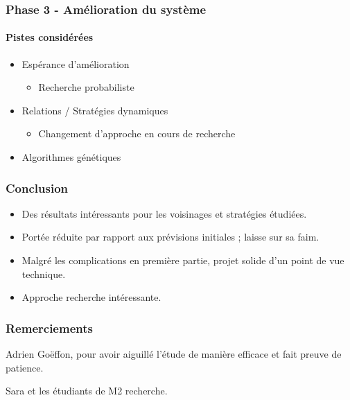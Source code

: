 \documentclass{beamer}
\begin{document}
\begin{frame}
  \frametitle{Phase 3 - Amélioration du système}
  \framesubtitle{Pistes considérées}
  
  \begin{itemize}
    \item Espérance d'amélioration
    \begin{itemize}
      \item Recherche probabiliste
    \end{itemize}
    \item Relations / Stratégies dynamiques
    \begin{itemize}
      \item Changement d'approche en cours de recherche
    \end{itemize}
    \item Algorithmes génétiques
  \end{itemize}

\end{frame}



\begin{frame}
  \frametitle{Conclusion}
  
  \begin{itemize}
    \item Des résultats intéressants pour les voisinages et stratégies étudiées.
    \item Portée réduite par rapport aux prévisions initiales ; laisse sur sa
faim.
    \item Malgré les complications en première partie, projet solide d'un
point de vue technique.
    \item Approche recherche intéressante.
  \end{itemize}

\end{frame}


\begin{frame}
  \frametitle{Remerciements}
  
  Adrien Goëffon, pour avoir aiguillé l'étude de manière efficace et fait
preuve de patience.

  Sara et les étudiants de M2 recherche.
\end{frame}
\end{document}
